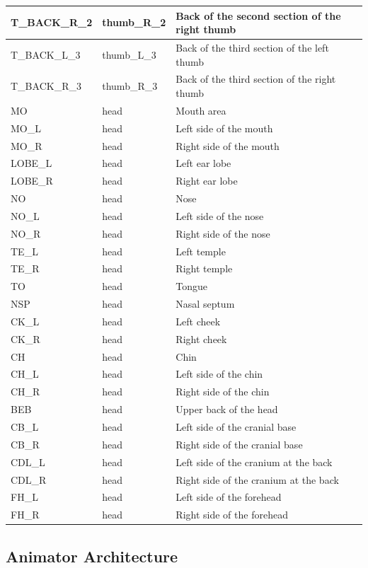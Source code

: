 \documentclass[../main.tex]{subfiles}
\begin{document}
\begin{longtable}{|p{2cm}|p{3cm}|p{5cm}|}
    T\_BACK\_R\_2 & thumb\_R\_2 & Back of the second section of the right thumb \\ \hline
    T\_BACK\_L\_3 & thumb\_L\_3 & Back of the third section of the left thumb \\ \hline
    T\_BACK\_R\_3 & thumb\_R\_3 & Back of the third section of the right thumb \\ \hline
    MO & head & Mouth area \\ \hline
    MO\_L & head & Left side of the mouth \\ \hline
    MO\_R & head & Right side of the mouth \\ \hline
    LOBE\_L & head & Left ear lobe \\ \hline
    LOBE\_R & head & Right ear lobe \\ \hline
    NO & head & Nose \\ \hline
    NO\_L & head & Left side of the nose \\ \hline
    NO\_R & head & Right side of the nose \\ \hline
    TE\_L & head & Left temple \\ \hline
    TE\_R & head & Right temple \\ \hline
    TO & head & Tongue \\ \hline
    NSP & head & Nasal septum \\ \hline
    CK\_L & head & Left cheek \\ \hline
    CK\_R & head & Right cheek \\ \hline
    CH & head & Chin \\ \hline
    CH\_L & head & Left side of the chin \\ \hline
    CH\_R & head & Right side of the chin \\ \hline
    BEB & head & Upper back of the head \\ \hline
    CB\_L & head & Left side of the cranial base \\ \hline
    CB\_R & head & Right side of the cranial base \\ \hline
    CDL\_L & head & Left side of the cranium at the back \\ \hline
    CDL\_R & head & Right side of the cranium at the back \\ \hline
    FH\_L & head & Left side of the forehead \\ \hline
    FH\_R & head & Right side of the forehead \\ \hline
\end{longtable}

\subsection{Animator Architecture}
\label{annex:avatar_creation_pose_synthesis:animator_architecture}
\end{document}
